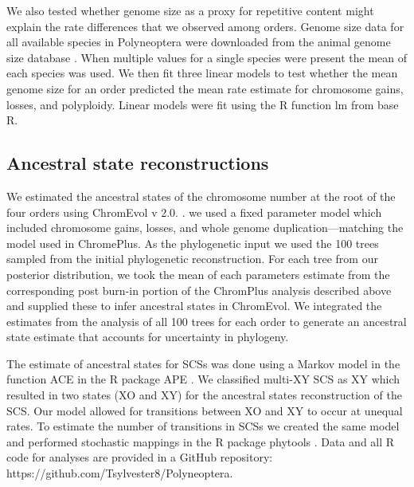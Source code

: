 We also tested whether genome size as a proxy for repetitive content might explain the rate differences that we observed among orders.
Genome size data for all available species in Polyneoptera were downloaded from the animal genome size database \citep{gregory2019}.
When multiple values for a single species were present the mean of each species was used.
We then fit three linear models to test whether the mean genome size for an order predicted the mean rate estimate for chromosome gains, losses, and polyploidy. 
Linear models were fit using the R function lm from base R.

\subsection{Ancestral state reconstructions}
We estimated the ancestral states of the chromosome number at the root of the four orders using ChromEvol v 2.0. \citep{glick2014chromevol, mayrose2009chromevol}.
we used a fixed parameter model which included chromosome gains, losses, and whole genome duplication---matching the model used in ChromePlus.
As the phylogenetic input we used the 100 trees sampled from the initial phylogenetic reconstruction. 
For each tree from our posterior distribution, we took the mean of each parameters estimate from the corresponding post burn-in portion of the ChromPlus analysis described above and supplied these to infer ancestral states in ChromEvol.
We integrated the estimates from the analysis of all 100 trees for each order to generate an ancestral state estimate that accounts for uncertainty in phylogeny. 

The estimate of ancestral states for SCSs was done using a Markov model in the function ACE in the R package APE \citep{Paradis2018}.
We classified multi-XY SCS as XY which resulted in two states (XO and XY) for the ancestral states reconstruction of the SCS. 
Our model allowed for transitions between XO and XY to occur at unequal rates.
To estimate the number of transitions in SCSs we created the same model and performed stochastic mappings in the R package phytools \citep{revell2012phytools}.
Data and all R code for analyses are provided in a GitHub repository: https://github.com/Tsylvester8/Polyneoptera. 

